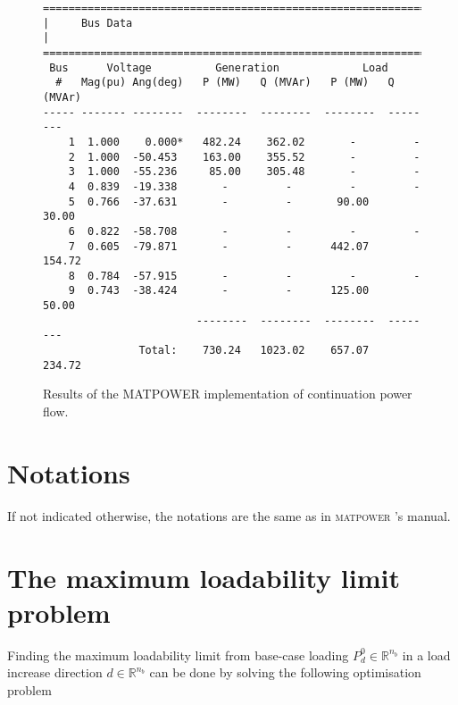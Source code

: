 \documentclass[12pt,a4]{article}
\newcommand*{\field}[1]{\mathbb{#1}}
\newcommand*{\R}{\field{R}} %
\newcommand*{\matpower}{\textsc{matpower} }
\begin{document}
\begin{figure}[!h]
  \centering
\begin{verbatim}
================================================================================
|     Bus Data                                                                 |
================================================================================
 Bus      Voltage          Generation             Load        
  #   Mag(pu) Ang(deg)   P (MW)   Q (MVAr)   P (MW)   Q (MVAr)
----- ------- --------  --------  --------  --------  --------
    1  1.000    0.000*   482.24    362.02       -         -   
    2  1.000  -50.453    163.00    355.52       -         -   
    3  1.000  -55.236     85.00    305.48       -         -   
    4  0.839  -19.338       -         -         -         -   
    5  0.766  -37.631       -         -       90.00     30.00 
    6  0.822  -58.708       -         -         -         -   
    7  0.605  -79.871       -         -      442.07    154.72 
    8  0.784  -57.915       -         -         -         -   
    9  0.743  -38.424       -         -      125.00     50.00 
                        --------  --------  --------  --------
               Total:    730.24   1023.02    657.07    234.72
\end{verbatim}  
  \caption{Results of the MATPOWER implementation of continuation power flow.}\label{fig:res-ieee9-cpf}
\end{figure}

\section{Notations}
\label{sec:notations}

If not indicated otherwise, the notations are the same as in \matpower's manual.

\section{The maximum loadability limit problem}
\label{sec:maxim-load-limit}

Finding the maximum loadability limit from base-case loading $P_d^0 \in \R^{n_b}$ in a load increase direction $d \in \R^{n_b}$ can be done by solving the following optimisation problem
\end{document}
